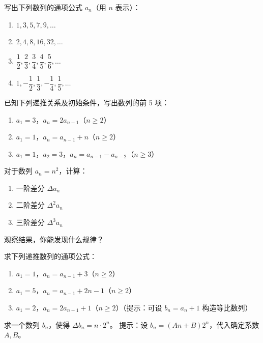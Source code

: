 \documentclass{ctexart}
\begin{document}
\begin{exercise}写出下列数列的通项公式 \(a_n\)（用 \(n\) 表示）：
\begin{enumerate}
\item \(1, 3, 5, 7, 9, \dots\)
\item \(2, 4, 8, 16, 32, \dots\)
\item \(\dfrac{1}{2}, \dfrac{2}{3}, \dfrac{3}{4}, \dfrac{4}{5}, \dfrac{5}{6}, \dots\)
\item \(1, -\dfrac{1}{2}, \dfrac{1}{3}, -\dfrac{1}{4}, \dfrac{1}{5}, \dots\)
\end{enumerate}
\end{exercise}

\begin{exercise}已知下列递推关系及初始条件，写出数列的前 5 项：
\begin{enumerate}
\item \(a_1 = 3\)，\(a_n = 2a_{n-1}\)（\(n \geq 2\)）
\item \(a_1 = 1\)，\(a_n = a_{n-1} + n\)（\(n \geq 2\)）
\item \(a_1 = 1\)，\(a_2 = 3\)，\(a_n = a_{n-1} - a_{n-2}\)（\(n \geq 3\)）
\end{enumerate}
\end{exercise}

\begin{exercise}对于数列 \(a_n = n^2\)，计算：
\begin{enumerate}
\item 一阶差分 \(\Delta a_n\)
\item 二阶差分 \(\Delta^2 a_n\)
\item 三阶差分 \(\Delta^3 a_n\)
\end{enumerate}
观察结果，你能发现什么规律？
\end{exercise}

\begin{exercise}求下列递推数列的通项公式：
\begin{enumerate}
\item \(a_1 = 1\)，\(a_n = a_{n-1} + 3\)（\(n \geq 2\)）
\item \(a_1 = 5\)，\(a_n = a_{n-1} + 2n - 1\)（\(n \geq 2\)）
\item \(a_1 = 2\)，\(a_n = 2a_{n-1} + 1\)（\(n \geq 2\)）\quad（提示：可设 \(b_n = a_n + 1\) 构造等比数列）
\end{enumerate}
\end{exercise}

\begin{exercise}求一个数列 \(b_n\)，使得 \(\Delta b_n = n \cdot 2^n\)。
提示：设 \(b_n = (An + B)2^n\)，代入确定系数 \(A, B\)。
\end{exercise}
\end{document}
